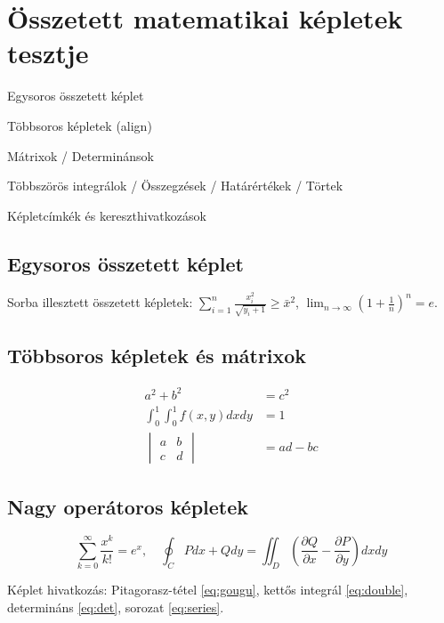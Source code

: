 \documentclass[hu]{../../elegantbook}
\begin{document}
\chapter{Összetett matematikai képletek tesztje}
\begin{introduction}
\item Egysoros összetett képlet
\item Többsoros képletek (align)
\item Mátrixok / Determinánsok
\item Többszörös integrálok / Összegzések / Határértékek / Törtek
\item Képletcímkék és kereszthivatkozások
\end{introduction}

\section{Egysoros összetett képlet}
Sorba illesztett összetett képletek: $\sum_{i=1}^n \frac{x_i^2}{\sqrt{y_i+1}} \geq \bar{x}^2$, $\lim_{n\to\infty} \left(1+\frac{1}{n}\right)^n = e$.

\section{Többsoros képletek és mátrixok}
\begin{align}
a^2 + b^2 &= c^2 \label{eq:gougu} \\
\int_{0}^{1}\int_{0}^{1} f(x,y) dxdy &= 1 \label{eq:double} \\
\begin{vmatrix}
a & b \\
c & d
\end{vmatrix} &= ad-bc \label{eq:det}
\end{align}

\section{Nagy operátoros képletek}
\begin{equation}\label{eq:series}
\sum_{k=0}^{\infty} \frac{x^k}{k!} = e^x,\quad \oint_{C} Pdx+Qdy = \iint_{D}\left(\frac{\partial Q}{\partial x}-\frac{\partial P}{\partial y}\right)dxdy
\end{equation}

Képlet hivatkozás: Pitagorasz-tétel \eqref{eq:gougu}, kettős integrál \eqref{eq:double}, determináns \eqref{eq:det}, sorozat \eqref{eq:series}.
\end{document}
